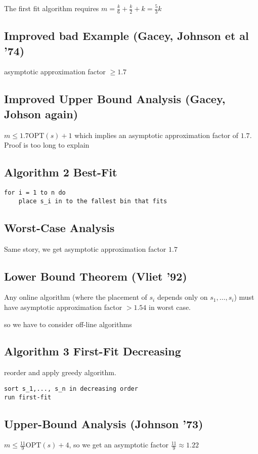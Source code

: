 \documentclass[english,12pt]{article}
\theoremstyle{plain}
\theoremstyle{definition}
\theoremstyle{definition} %
\begin{document}
The first fit algorithm requires $m=\frac{k}{6}+\frac{k}{2}+k=\frac{5}{3}k$

\subsection{Improved bad Example (Gacey, Johnson et al '74)}
asymptotic approximation factor $\ge 1.7$

\subsection{Improved Upper Bound Analysis (Gacey, Johson again)}
$m\le 1.7\text{OPT}(s)+1$ which implies an asymptotic approximation factor of $1.7$.  Proof is too long to explain

\subsection{Algorithm 2 Best-Fit}
\begin{verbatim}
for i = 1 to n do
    place s_i in to the fallest bin that fits
\end{verbatim}

\subsection{Worst-Case Analysis}
Same story, we get asymptotic approximation factor $1.7$

\subsection{Lower Bound Theorem (Vliet '92)}
Any online algorithm (where the placement of $s_i$ depends only on $s_1,\ldots, s_i$) must have asymptotic approximation factor $>1.54$ in worst case.

so we have to consider off-line algorithms

\subsection{Algorithm 3 First-Fit Decreasing}
reorder and apply greedy algorithm.
\begin{verbatim}
sort s_1,..., s_n in decreasing order
run first-fit
\end{verbatim}

\subsection{Upper-Bound Analysis (Johnson '73)}
$m\le \frac{11}{9}\text{OPT}(s)+4$, so we get an asymptotic factor $\frac{11}{9}\approx 1.22$
\end{document}
